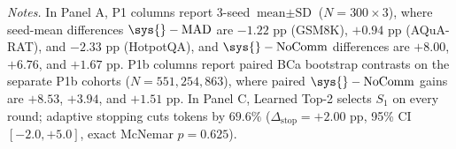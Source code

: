 \begin{table}[!t]
\vspace{2pt}
\parbox{0.96\textwidth}{\footnotesize
\textit{Notes.}
In Panel A, P1 columns report 3-seed $\text{mean}\pm\text{SD}$ ($N=300\times 3$), where seed-mean differences $\sys{}-\text{MAD}$ are $-1.22$ pp (GSM8K), $+0.94$ pp (AQuA-RAT), and $-2.33$ pp (HotpotQA), and $\sys{}-\text{NoComm}$ differences are $+8.00$, $+6.76$, and $+1.67$ pp. P1b columns report paired BCa bootstrap contrasts on the separate P1b cohorts ($N=551, 254, 863$), where paired $\sys{}-\text{NoComm}$ gains are $+8.53$, $+3.94$, and $+1.51$ pp. In Panel C, Learned Top-2 selects $S_1$ on every round; adaptive stopping cuts tokens by $69.6\%$ ($\Delta_{\mathrm{stop}}=+2.00$ pp, 95\% CI $[-2.0,+5.0]$, exact McNemar $p=0.625$).
}
\end{table}
